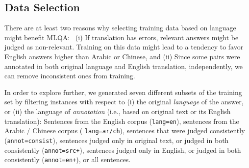 \documentclass{sig-alternate-05-2015}
\begin{document}
\subsection{Data Selection} \label{sec:data}
There are at least two reasons why selecting training data based on language might benefit MLQA:\
(i) If translation has errors, relevant answers might 
be judged as non-relevant. Training on this data might lead to a tendency to favor 
English answers higher than Arabic or Chinese, and (ii)
Since some pairs were annotated in both original language and English translation, independently, we can remove 
inconsistent ones from training.

In order to explore further, we generated seven different subsets of the training set by filtering instances with respect to (i) the 
original \emph{language} of the answer, or (ii) the language of \emph{annotation} (i.e., based on original text or its
English translation): Sentences from the English corpus ({\tt lang=en}), sentences from the Arabic / Chinese corpus (
{\tt lang=ar/ch}), sentences that were judged consistently ({\tt annot=consist}), sentences judged only in original text, 
or judged in both consistently ({\tt annot=src+}), sentences judged only in English, or judged in both consistently ({\tt  annot=en+}),
or all sentences.
\vspace{-0.35cm}

\end{document}
